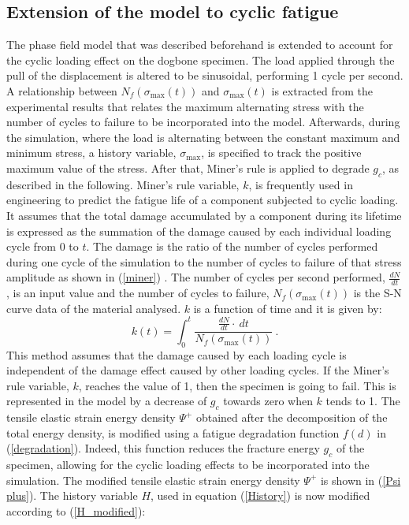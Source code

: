 \documentclass[11pt,a4paper]{article}
\begin{document}
\subsection{Extension of the model to cyclic fatigue}
The phase field model that was described beforehand is extended to account for the cyclic loading effect on the dogbone specimen. The load applied through the pull of the displacement is altered to be sinusoidal, performing 1 cycle per second. A relationship between $N_f(\sigma_{\textrm{max}}(t))$ and $\sigma_{\textrm{max}}(t)$ is extracted from the experimental results that relates the maximum alternating stress with the number of cycles to failure to be incorporated into the model. Afterwards, during the simulation, where the load is alternating between the constant maximum and minimum stress, a history variable, $\sigma_{\textrm{max}}$, is specified to track the positive maximum value of the stress. 
After that, Miner's rule is applied to degrade $g_c$, as described in the following. Miner's rule variable, $k$, is frequently used in engineering to predict the fatigue life of a component subjected to cyclic loading. It assumes that the total damage accumulated by a component during its lifetime is expressed as the summation of the damage caused by each individual loading cycle from 0 to $t$. The damage is the ratio of the number of cycles performed during one cycle of the simulation to the number of cycles to failure of that stress amplitude as shown in (\ref{miner}) \cite{SUN201416}. The number of cycles per second performed, $\frac{dN}{dt}$, is an input value and the number of cycles to failure, $N_f(\sigma_{\textrm{max}}(t))$ is the S-N curve data of the material analysed. $k$ is a function of time and it is given by:
\begin{equation}
k (t) = \int_{0}^{t} \frac{\frac{dN}{dt}\cdot~dt}{N_f(\sigma_{\textrm{max}}(t))} \ . 
\label{miner}
\end{equation}
This method assumes that the damage caused by each loading cycle is independent of the damage effect caused by other loading cycles.
If the Miner's rule variable, $k$, reaches the value of 1, then the specimen is going to fail. This is represented in the model by a decrease of $g_c$ towards zero when $k$ tends to 1. The tensile elastic strain energy density $\Psi^+$ obtained after the decomposition of the total energy density, is modified using a fatigue degradation function $f(d)$ in (\ref{degradation}). Indeed, this function reduces the fracture energy $g_c$ of the specimen, allowing for the cyclic loading effects to be incorporated into the simulation. The modified tensile elastic strain energy density $\Psi^+$ is shown in (\ref{Psi plus}). The history variable $H$,  used in equation (\ref{History}) is now modified according to (\ref{H_modified}):
\end{document}
